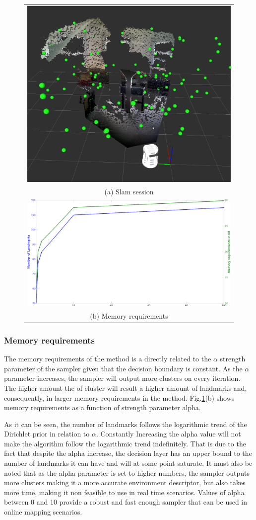 \documentclass[]{article}
\begin{document}
    \begin{figure}
        \begin{tabular}{c}
            \includegraphics[width=.253\textwidth]{slam110landmarks2} \\
            (a) Slam session \\
            \includegraphics[width=.253\textwidth]{memoryRequirements} \\
            (b) Memory requirements \\[6pt]
        \end{tabular}
        \label{slam}
    \end{figure}



    \subsubsection{Memory requirements}

    The memory requirements of the method is a directly related to the $\alpha$ strength parameter of the sampler given that the decision boundary is constant. As the $\alpha$ parameter increases, the sampler will output more clusters on every iteration. The higher amount the of cluster will result a higher amount of landmarks and, consequently, in larger memory requirements in the method. Fig.\ref{slam}(b) shows memory requirements as a function of strength parameter alpha.

    As it can be seen, the number of landmarks follows the logarithmic trend of the Dirichlet prior in relation to $\alpha$. Constantly Increasing the alpha value will not make the algorithm follow the logarithmic trend indefinitely. That is due to the fact that despite the alpha increase, the decision layer has an upper bound to the number of landmarks it can have and will at some point saturate. It must also be noted that as the alpha parameter is set to higher numbers, the sampler outputs more clusters making it a more accurate environment descriptor, but also takes more time, making it non feasible to use in real time scenarios. Values of alpha between 0 and 10 provide a robust and fast enough sampler that can be used in online mapping scenarios.
\end{document}
